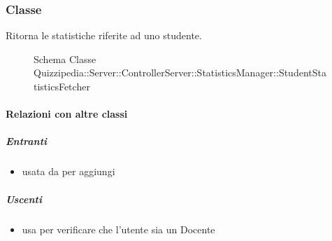 \subsubsection{Classe }
Ritorna le statistiche riferite ad uno studente.
\begin{figure}[H]
\centering
\noindent{}
\caption[Schema Classe StudentStatisticsFetcher]{Schema Classe Quizzipedia::Server::ControllerServer::StatisticsManager::StudentStatisticsFetcher}
\end{figure}
\paragraph{Relazioni con altre classi}
\subparagraph{Entranti}
\begin{itemize}
\item usata da  per aggiungi
\end{itemize}
\subparagraph{Uscenti}
\begin{itemize}
\item usa  per verificare che l'utente sia un Docente
\end{itemize}
